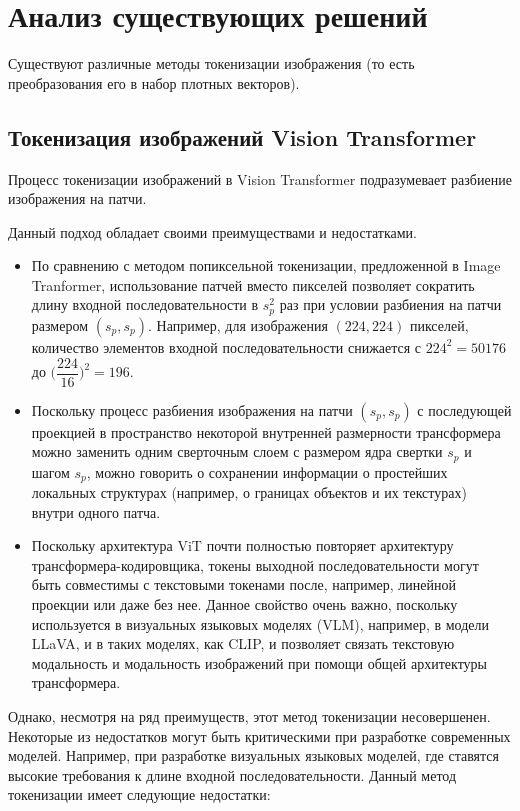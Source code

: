 \documentclass[times,specification,annotation]{itmo-student-thesis}
\begin{document}
\chapter{Анализ существующих решений}
Существуют различные методы токенизации изображения (то есть преобразования его в набор плотных векторов).

\section{Токенизация изображений Vision Transformer}
Процесс токенизации изображений в Vision Transformer подразумевает разбиение изображения на патчи.

Данный подход обладает своими преимуществами и недостатками.

\begin{itemize}
    \item По сравнению с методом попиксельной токенизации, предложенной в Image Tranformer, использование патчей вместо пикселей позволяет сократить длину входной последовательности в $s_p^2$ раз при условии разбиения на патчи размером $(s_p, s_p)$. Например, для изображения $(224, 224)$ пикселей, количество элементов входной последовательности снижается с $224^2 = 50 176$ до $ \Big(\dfrac{224}{16}\Big)^2 = 196$.
    \item Поскольку процесс разбиения изображения на патчи $(s_p, s_p)$ с последующей проекцией в пространство некоторой внутренней размерности трансформера можно заменить одним сверточным слоем с размером ядра свертки $s_p$ и шагом $s_p$, можно говорить о сохранении информации о простейших локальных структурах (например, о границах объектов и их текстурах) внутри одного патча.
    \item Поскольку архитектура ViT почти полностью повторяет архитектуру трансформера-кодировщика, токены выходной последовательности могут быть совместимы с текстовыми токенами после, например, линейной проекции или даже без нее. Данное свойство очень важно, поскольку используется в визуальных языковых моделях (VLM), например, в модели LLaVA\cite{llava}, и в таких моделях, как CLIP\cite{clip}, и позволяет связать текстовую модальность и модальность изображений при помощи общей архитектуры трансформера.
\end{itemize}

Однако, несмотря на ряд преимуществ, этот метод токенизации несовершенен. Некоторые из недостатков могут быть критическими при разработке современных моделей. Например, при разработке визуальных языковых моделей, где ставятся высокие требования к длине входной последовательности. Данный метод токенизации имеет следующие недостатки:
\end{document}
